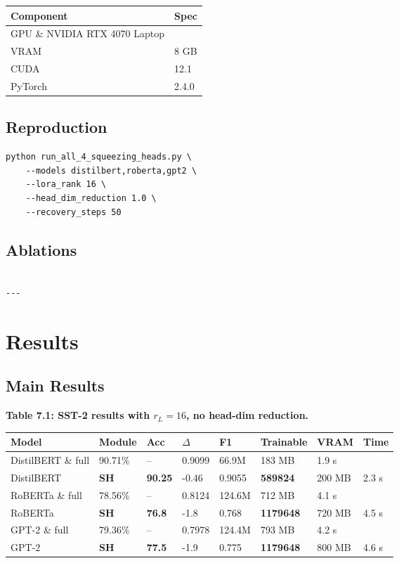 \begin{table}[H]
\centering
\small
\begin{tabular}{ll}
\toprule
\textbf{Component} & \textbf{Spec} \\
\midrule
GPU \& NVIDIA RTX 4070 Laptop \\
VRAM & 8 GB \\
CUDA & 12.1 \\
PyTorch & 2.4.0 \\
\bottomrule
\end{tabular}
\end{table}

\subsection{Reproduction}

\begin{lstlisting}
python run_all_4_squeezing_heads.py \
    --models distilbert,roberta,gpt2 \
    --lora_rank 16 \
    --head_dim_reduction 1.0 \
    --recovery_steps 50
\end{lstlisting}

\subsection{Ablations}

\begin{lstlisting}

---
\end{lstlisting}


\section{Results}

\subsection{Main Results}

\textbf{Table 7.1: SST-2 results with $r_L = 16$, no head-dim reduction.}

\begin{table}[H]
\centering
\small
\begin{tabular}{llllllll}
\toprule
\textbf{Model} & \textbf{Module} & \textbf{Acc} & \textbf{$\Delta$} & \textbf{F1} & \textbf{Trainable} & \textbf{VRAM} & \textbf{Time} \\
\midrule
DistilBERT \& full & 90.71\% & -- & 0.9099 & 66.9M & 183 MB & 1.9 s \\
DistilBERT & \textbf{SH} & \textbf{90.25} & -0.46 & 0.9055 & \textbf{589824} & 200 MB & 2.3 s \\
RoBERTa \& full & 78.56\% & -- & 0.8124 & 124.6M & 712 MB & 4.1 s \\
RoBERTa & \textbf{SH} & \textbf{76.8} & -1.8 & 0.768 & \textbf{1179648} & 720 MB & 4.5 s \\
GPT-2 \& full & 79.36\% & -- & 0.7978 & 124.4M & 793 MB & 4.2 s \\
GPT-2 & \textbf{SH} & \textbf{77.5} & -1.9 & 0.775 & \textbf{1179648} & 800 MB & 4.6 s \\
\bottomrule
\end{tabular}
\end{table}

